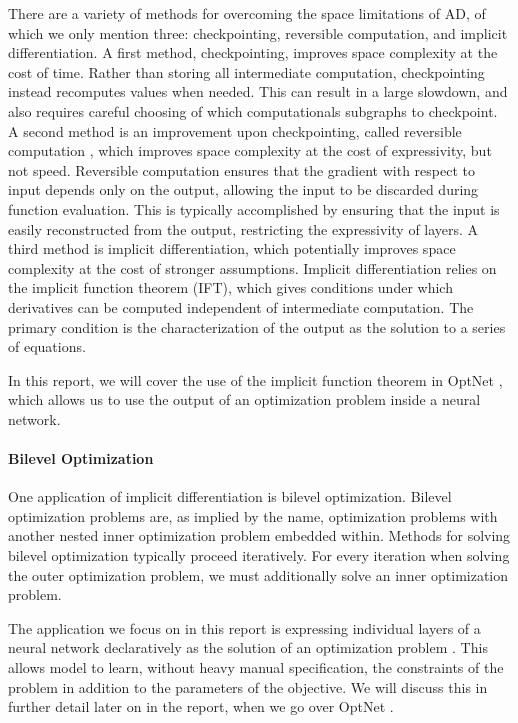 \documentclass[11pt]{article}
\begin{document}
There are a variety of methods for overcoming the space limitations of AD,
of which we only mention three: checkpointing, reversible computation, and implicit differentiation.
A first method, checkpointing, improves space complexity at the cost of time.
Rather than storing all intermediate computation,
checkpointing instead recomputes values when needed.
This can result in a large slowdown,
and also requires careful choosing of which computationals subgraphs to checkpoint.
A second method is an improvement upon checkpointing, called reversible computation \citep{maclaurin2015reversible,gomez2017reversible},
which improves space complexity at the cost of expressivity, but not speed.
Reversible computation ensures that the gradient with respect to input depends only on the output,
allowing the input to be discarded during function evaluation.
This is typically accomplished by ensuring that the input is easily reconstructed from the output,
restricting the expressivity of layers.
A third method is implicit differentiation,
which potentially improves space complexity at the cost of stronger assumptions.
Implicit differentiation relies on the implicit function theorem (IFT),
which gives conditions under which derivatives can be computed independent of
intermediate computation.
The primary condition is the characterization of the output as the solution
to a series of equations.

In this report, we will cover the use of the implicit function theorem
in OptNet \citep{optnet}, which allows us to use the output of an
optimization problem inside a neural network.

\paragraph{Bilevel Optimization}
One application of implicit differentiation is bilevel optimization.
Bilevel optimization problems are, as implied by the name,
optimization problems with another nested inner optimization problem embedded within.
Methods for solving bilevel optimization typically proceed iteratively.
For every iteration when solving the outer optimization problem,
we must additionally solve an inner optimization problem.

The application we focus on in this report is expressing individual layers of a neural network declaratively
as the solution of an optimization problem \citep{optnet,agrawal2019diffcvx,gould2019declarative}.
This allows model to learn, without heavy manual specification, the constraints of the problem
in addition to the parameters of the objective.
We will discuss this in further detail later on in the report,
when we go over OptNet \citep{optnet}.
\end{document}
